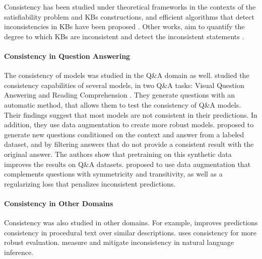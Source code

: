 Consistency has been studied under theoretical frameworks in the contexts of the satisfiability problem and KBs constructions, and efficient algorithms that detect inconsistencies in KBs have been proposed \cite{hansen2000probabilistic,andersen2001easy}.
Other works, aim to quantify the degree to which KBs are inconsistent and detect the inconsistent statements \cite{Thimm:2009d,muino2011measuring,Thimm:2013}.



\paragraph{Consistency in Question Answering}
The consistency of models was studied in the Q\&A domain as well. \citet{ribeiro-etal-2019-red} studied the consistency capabilities of several models, in two Q\&A tasks: Visual Question Answering \cite{vqa} and Reading Comprehension \cite{squad}. They generate questions with an automatic method, that allows them to test the consistency of Q\&A models.
Their findings suggest that most models are not consistent in their predictions. In addition, they use data augmentation to create more robust models.
\citet{alberti2019synthetic} proposed to generate new questions conditioned on the context and answer from a labeled dataset, and by filtering answers that do not provide a consistent result with the original answer. The authors show that pretraining on this synthetic data improves the results on Q\&A datasets.
\citet{consistent-qa} proposed  to use data augmentation that complements questions with symmetricity and transitivity, as well as a regularizing loss that penalizes inconsistent predictions.

\paragraph{Consistency in Other Domains}
Consistency was also studied in other domains. For example, \citet{du2019consistent} improves predictions consistency in procedural text over similar descriptions. \citet{ribeiro-etal-2020-beyond} uses consistency for more robust evaluation. \citet{li-etal-2019-logic} measure and mitigate inconsistency in natural language inference.

